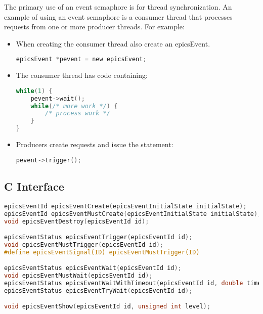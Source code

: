 The primary use of an event semaphore is for thread synchronization.
An example of using an event semaphore is a consumer thread that processes requests from one or more producer threads.
For example:

\begin{itemize}
\item When creating the consumer thread also create an epicsEvent.

\begin{lstlisting}[language=C]
epicsEvent *pevent = new epicsEvent;
\end{lstlisting}

\item The consumer thread has code containing:

\begin{lstlisting}[language=C]
while(1) {
    pevent->wait();
    while(/* more work */) {
        /* process work */
    }
}
\end{lstlisting}

\item Producers create requests and issue the statement:

\begin{lstlisting}[language=C]
pevent->trigger();
\end{lstlisting}

\end{itemize}

\subsection{C Interface}

\begin{lstlisting}[language=C]
epicsEventId epicsEventCreate(epicsEventInitialState initialState);
epicsEventId epicsEventMustCreate(epicsEventInitialState initialState);
void epicsEventDestroy(epicsEventId id);

epicsEventStatus epicsEventTrigger(epicsEventId id);
void epicsEventMustTrigger(epicsEventId id);
#define epicsEventSignal(ID) epicsEventMustTrigger(ID)

epicsEventStatus epicsEventWait(epicsEventId id);
void epicsEventMustWait(epicsEventId id);
epicsEventStatus epicsEventWaitWithTimeout(epicsEventId id, double timeOut);
epicsEventStatus epicsEventTryWait(epicsEventId id);

void epicsEventShow(epicsEventId id, unsigned int level);
\end{lstlisting}

